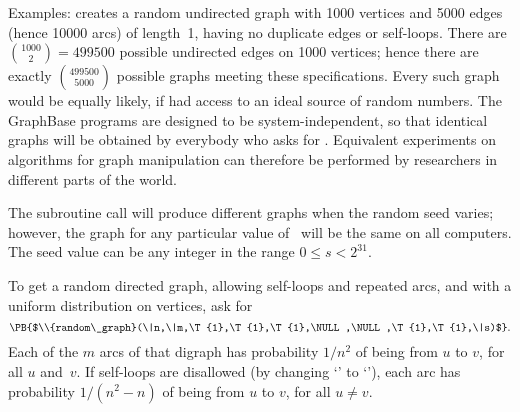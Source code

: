 \fi

Examples:  creates a random
undirected graph with 1000 vertices and 5000 edges (hence 10000 arcs) of
length~1, having
no duplicate edges or self-loops. There are ${1000\choose2}=499500$ possible
undirected edges on 1000 vertices; hence there are exactly $499500\choose5000$
possible graphs meeting these specifications. Every such graph would be
equally likely, if  had access to an ideal source of
random numbers. The GraphBase programs are designed to be
system-independent, so that identical graphs will be obtained by
everybody who asks for .
Equivalent experiments on algorithms for graph manipulation can therefore
be performed by researchers in different parts of the world.

The subroutine call 
will produce different graphs when the random seed  varies;
however, the graph for any particular value of~ will be the same on
all computers. The seed value can be any integer in the range $0\le s<2^{31}$.

To get a random directed graph, allowing self-loops and repeated arcs,
and with a uniform distribution on vertices, ask for
$$\hbox{\PB{$\\{random\_graph}(\|n,\|m,\T{1},\T{1},\T{1},\NULL,\NULL,\T{1},%
\T{1},\|s)$}}.$$
Each of the $m$ arcs of that digraph has probability $1/n^2$ of being from
$u$ to $v$, for all $u$ and~$v$. If self-loops are disallowed (by
changing `' to `'), each arc
has probability
$1/(n^2-n)$ of being from $u$ to $v$, for all $u\ne v$.

